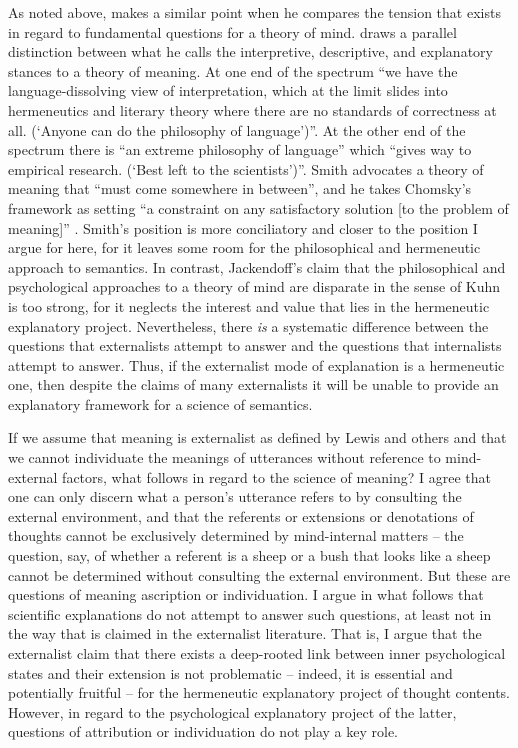 As noted above, \citet{Jackendoff1991} makes a similar point when he compares the tension that exists in regard to fundamental questions for a theory of mind. \citet{Smith1992} draws a parallel distinction between what he calls the interpretive, descriptive, and explanatory stances to a theory of meaning. At one end of the spectrum “we have the language-dissolving view of interpretation, which at the limit slides into hermeneutics and literary theory where there are no standards of correctness at all. (‘Anyone can do the philosophy of language’)”. At the other end of the spectrum there is “an extreme philosophy of language” which “gives way to empirical research. (‘Best left to the scientists’)”. Smith advocates a theory of meaning that “must come somewhere in between”, and he takes Chomsky’s framework as setting “a constraint on any satisfactory solution [to the problem of meaning]” \citep[138--139]{Smith1992}. Smith’s position is more conciliatory and closer to the position I argue for here, for it leaves some room for the philosophical and hermeneutic approach to semantics. In contrast, Jackendoff’s claim that the philosophical and psychological approaches to a theory of mind are disparate in the sense of Kuhn is too strong, for it neglects the interest and value that lies in the hermeneutic explanatory project. Nevertheless, there \textit{is} a systematic difference between the questions that externalists attempt to answer and the questions that internalists attempt to answer. Thus, if the externalist mode of explanation is a hermeneutic one, then despite the claims of many externalists it will be unable to provide an explanatory framework for a science of semantics.

If we assume that meaning is externalist as defined by Lewis and others and that we cannot individuate the meanings of utterances without reference to mind-external factors, what follows in regard to the science of meaning? I agree that one can only discern what a person’s utterance refers to by consulting the external environment, and that the referents or extensions or denotations of thoughts cannot be exclusively determined by mind-internal matters – the question, say, of whether a referent is a sheep or a bush that looks like a sheep cannot be determined without consulting the external environment. But these are questions of meaning ascription or individuation. I argue in what follows that scientific explanations do not attempt to answer such questions, at least not in the way that is claimed in the externalist literature. That is, I argue that the externalist claim that there exists a deep-rooted link between inner psychological states and their extension is not problematic – indeed, it is essential and potentially fruitful – for the hermeneutic explanatory project of thought contents. However, in regard to the psychological explanatory project of the latter, questions of attribution or individuation do not play a key role.


